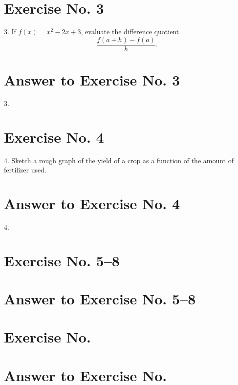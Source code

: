 \documentclass[oneside, 11pt, DIV = 10, BCOR = 0mm, headsepline = 0.8pt, footsepline = 0.4pt, numbers = noenddot, headings = openany]{scrbook}
\begin{document}
\chapter*{Exercise No. 3}
\label{sec:orgc969394}
\begin{EnumerateQuestions}
  \item[3.] If \(f(x) = x^2 - 2x + 3\), evaluate the difference quotient
   \[\frac{f(a + h) - f(a)}{h}.\]
\end{EnumerateQuestions}
\chapter*{Answer to Exercise No. 3}
\label{sec:org15df9e7}
\begin{EnumerateQuestions}
  \item[3.]
\end{EnumerateQuestions}
\chapter*{Exercise No. 4}
\label{sec:org02ab8be}
\begin{EnumerateQuestions}
  \item[4.] Sketch a rough graph of the yield of a crop as a function of  the amount of fertilizer used.
\end{EnumerateQuestions}
\chapter*{Answer to Exercise No. 4}
\label{sec:orgc9dbeed}
\begin{EnumerateQuestions}
  \item[4.]
\end{EnumerateQuestions}
\chapter*{Exercise No. 5–8}
\label{sec:org89de9e0}

\chapter*{Answer to Exercise No. 5–8}
\label{sec:orgdb949e7}

\chapter*{Exercise No.}
\label{sec:orga0075ff}

\chapter*{Answer to Exercise No.}
\label{sec:orgbd0df9d}
\end{document}
